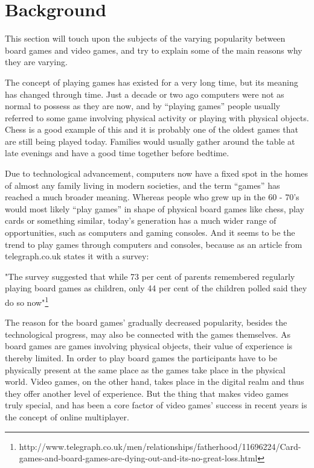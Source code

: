 
\chapter{Background}

This section will touch upon the subjects of the varying popularity between
 board games and video games, and try to explain some of the main reasons why
 they are varying.\newline

The concept of playing games has existed for a very long time, but its meaning
 has changed through time. Just a decade or two ago computers were not as
 normal to possess as they are now, and by “playing games” people usually
 referred to some game involving physical activity or playing with physical
  objects. Chess is a good example of this and it is probably one of the
  oldest games that are still being played today.
Families would usually gather around the table at late evenings and have a
good time together before bedtime.\newline

Due to technological advancement, computers now have a fixed spot in the
 homes of almost any family living in modern societies, and the term “games”
 has reached a much broader meaning. Whereas people who grew up in the
  60 - 70’s would most likely “play games” in shape of physical board
  games like chess, play cards or something similar, today’s generation
  has a much wider range of opportunities, such as computers and gaming
   consoles. And it seems to be the trend to play games through computers
    and consoles, because as an article from telegraph.co.uk states it with
     a survey:\newline

"The survey suggested that while 73 per cent of parents remembered regularly
 playing board games as children, only 44 per cent of the children polled said
 they do so now"\footnote{http://www.telegraph.co.uk/men/relationships/fatherhood/11696224/Card-games-and-board-games-are-dying-out-and-its-no-great-loss.html}\newline

The reason for the board games' gradually decreased popularity, besides
 the technological progress, may also be connected with the games themselves.
  As board games are games involving physical objects, their value of
   experience is thereby limited. In order to play board games the participants
   have to be physically present at the same place as the games take place in
   the physical world. Video games, on the other hand, takes place in the
   digital realm and thus they offer another level of experience. But the
   thing that makes video games truly special, and has been a core factor
   of video games’ success in recent years is the concept of online
    multiplayer.\newline


